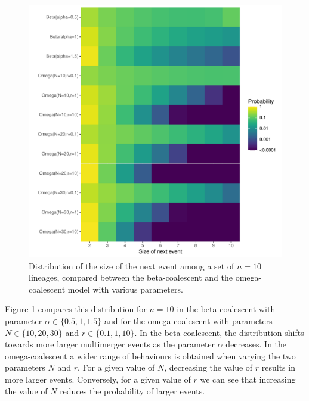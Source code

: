 \documentclass{article}
\begin{document}
\begin{figure}[!p]
\begin{center}
\includegraphics[width=15cm]{../run/figureCompare.pdf}
\end{center}
\caption{Distribution of the size of the next event among a set of $n=10$ lineages, 
compared between the beta-coalescent and the omega-coalescent model 
with various parameters.
\label{fig:compare}}
\end{figure}

Figure \ref{fig:compare} compares this distribution for $n=10$ in the beta-coalescent with 
parameter $\alpha \in \{0.5,1,1.5\}$ and for the omega-coalescent with parameters
$N \in \{10,20,30\}$ and $r \in \{0.1,1,10\}$. In the beta-coalescent, the distribution
shifts towards more larger multimerger events as the parameter $\alpha$ decreases.
In the omega-coalescent a wider range of behaviours is obtained when varying the two parameters
$N$ and $r$. For a given value of $N$, decreasing the value of $r$ results in more
larger events. Conversely, for a given value of $r$ we can see that increasing the
value of $N$ reduces the probability of larger events.
\end{document}

